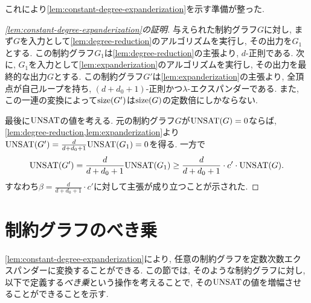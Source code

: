 これにより\cref{lem:constant-degree-expanderization}を示す準備が整った.
\begin{proof}[\cref{lem:constant-degree-expanderization}の証明]

与えられた制約グラフ$G$に対し, まず$G$を入力として\cref{lem:degree-reduction}のアルゴリズムを実行し, その出力を$G_1$とする.
この制約グラフ$G_1$は\cref{lem:degree-reduction}の主張より, $d$-正則である.
次に, $G_1$を入力として\cref{lem:expanderization}のアルゴリズムを実行し, その出力を最終的な出力$G$とする.
この制約グラフ$G'$は\cref{lem:expanderization}の主張より, 全頂点が自己ループを持ち, $(d+d_0+1)$-正則かつ$\lambda$-エクスパンダーである.
また, この一連の変換によって$\mathrm{size}(G')$は$\mathrm{size}(G)$の定数倍にしかならない.

最後に$\mathrm{UNSAT}$の値を考える.
元の制約グラフ$G$が$\mathrm{UNSAT}(G)=0$ならば, \cref{lem:degree-reduction,lem:expanderization}より
$\mathrm{UNSAT}(G') = \frac{d}{d+d_0+1}\mathrm{UNSAT}(G_1) = 0$を得る.
一方で
\begin{align*}
  \mathrm{UNSAT}(G') = \frac{d}{d+d_0+1}\mathrm{UNSAT}(G_1) \ge \frac{d}{d+d_0+1}\cdot c'\cdot\mathrm{UNSAT}(G).
\end{align*}
すなわち$\beta = \frac{d}{d+d_0+1}\cdot c'$に対して主張が成り立つことが示された.
\end{proof}

\section{制約グラフのべき乗}

\cref{lem:constant-degree-expanderization}により, 任意の制約グラフを定数次数エクスパンダーに変換することができる.
この節では, そのような制約グラフに対し, 以下で定義する\emph{べき乗}という操作を考えることで, その$\mathrm{UNSAT}$の値を増幅させることができることを示す.

